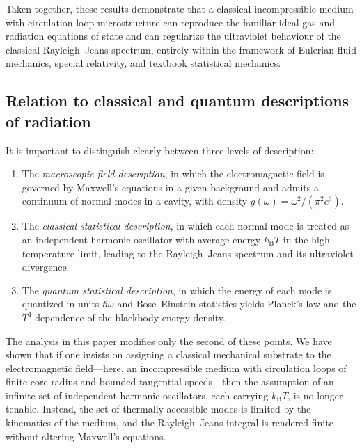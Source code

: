 \documentclass[11pt]{article}
\begin{document}
            Taken together, these results demonstrate that a classical incompressible medium with
            circulation-loop microstructure can reproduce the familiar ideal-gas and radiation
            equations of state and can regularize the ultraviolet behaviour of the classical
            Rayleigh--Jeans spectrum, entirely within the framework of Eulerian fluid mechanics,
            special relativity, and textbook statistical mechanics.

        \subsection{Relation to classical and quantum descriptions of radiation}

            It is important to distinguish clearly between three levels of description:

            \begin{enumerate}
                \item The \emph{macroscopic field description}, in which the electromagnetic field
                is governed by Maxwell's equations in a given background and admits a continuum
                of normal modes in a cavity, with density
                $g(\omega) = \omega^2/(\pi^2 c^3)$.

                \item The \emph{classical statistical description}, in which each normal mode is
                treated as an independent harmonic oscillator with average energy $k_{\mathrm B}T$
                in the high-temperature limit, leading to the Rayleigh--Jeans spectrum and its
                ultraviolet divergence.

                \item The \emph{quantum statistical description}, in which the energy of each mode
                is quantized in units $\hbar\omega$ and Bose--Einstein statistics yields
                Planck's law and the $T^4$ dependence of the blackbody energy density.
            \end{enumerate}

            The analysis in this paper modifies only the second of these points. We have shown that
            if one insists on assigning a classical mechanical substrate to the electromagnetic
            field---here, an incompressible medium with circulation loops of finite core radius and
            bounded tangential speeds---then the assumption of an infinite set of independent
            harmonic oscillators, each carrying $k_{\mathrm B}T$, is no longer tenable. Instead, the
            set of thermally accessible modes is limited by the kinematics of the medium, and the
            Rayleigh--Jeans integral is rendered finite without altering Maxwell's equations.
\end{document}
